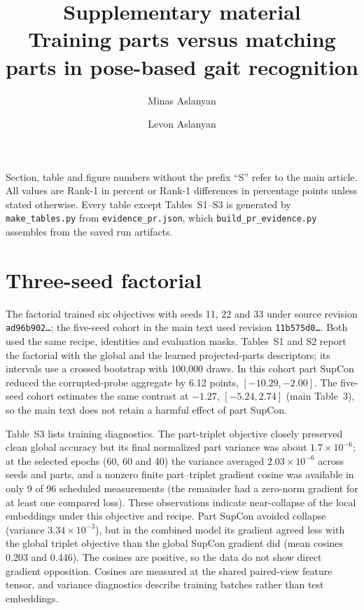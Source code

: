 \documentclass[11pt]{article}
\title{Supplementary material\\[4pt]
\large Training parts versus matching parts in pose-based gait recognition}
\author{Minas Aslanyan \and Levon Aslanyan}
\date{}
\begin{document}
\maketitle

\noindent Section, table and figure numbers without the prefix ``S'' refer to the
main article. All values are Rank-1 in percent or Rank-1 differences in
percentage points unless stated otherwise. Every table except Tables~S1--S3 is
generated by \texttt{make\_tables.py} from \texttt{evidence\_pr.json}, which
\texttt{build\_pr\_evidence.py} assembles from the saved run artifacts.

\section{Three-seed factorial}
\label{sec:s-factorial}

The factorial trained six objectives with seeds 11, 22 and 33 under source
revision \texttt{ad96b902\ldots}; the five-seed cohort in the main text used
revision \texttt{11b575d0\ldots}. Both used the same recipe, identities and
evaluation masks. Tables~S1 and S2 report the factorial with the global and the
learned projected-parts descriptors; its intervals use a crossed bootstrap with
100,000 draws. In this cohort part SupCon reduced the corrupted-probe aggregate
by 6.12 points, $[-10.29,-2.00]$. The five-seed cohort estimates the same
contrast at $-1.27$, $[-5.24,2.74]$ (main Table~3), so the main text does not
retain a harmful effect of part SupCon.

Table~S3 lists training diagnostics. The part-triplet objective closely
preserved clean global accuracy but its final normalized part variance was
about $1.7\times10^{-6}$; at the selected epochs (60, 60 and 40) the variance
averaged $2.03\times10^{-6}$ across seeds and parts, and a nonzero finite
part--triplet gradient cosine was available in only 9 of 96 scheduled
measurements (the remainder had a zero-norm gradient for at least one compared
loss). These observations indicate near-collapse of the local embeddings under
this objective and recipe. Part SupCon avoided collapse (variance
$3.34\times10^{-3}$), but in the combined model its gradient agreed less with
the global triplet objective than the global SupCon gradient did (mean cosines
0.203 and 0.446). The cosines are positive, so the data do not show direct
gradient opposition. Cosines are measured at the shared paired-view feature
tensor, and variance diagnostics describe training batches rather than test
embeddings.
\end{document}
